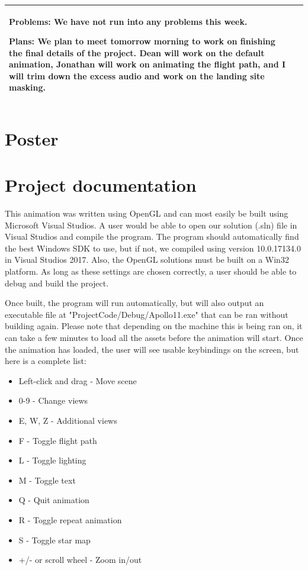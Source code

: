 \documentclass[onecolumn, draftclsnofoot,10pt, compsoc]{IEEEtran}
\begin{document}
\begin{longtable} {|p{1.5cm}|p{13.5cm}|}
Problems: We have not run into any problems this week.

Plans: We plan to meet tomorrow morning to work on finishing the final details of the project. Dean will work on the default animation, Jonathan will work on animating the flight path, and I will trim down the excess audio and work on the landing site masking.
\\ \hline

\end{longtable}

\section{Poster}


\section{Project documentation}

This animation was written using OpenGL and can most easily be built using Microsoft Visual Studios. A user would be able to open our solution (.sln) file in Visual Studios and compile the program. The program should automatically find the best Windows SDK to use, but if not, we compiled using version 10.0.17134.0 in Visual Studios 2017. Also, the OpenGL solutions must be built on a Win32 platform. As long as these settings are chosen correctly, a user should be able to debug and build the project. 

Once built, the program will run automatically, but will also output an executable file at "ProjectCode/Debug/Apollo11.exe" that can be ran without building again. Please note that depending on the machine this is being ran on, it can take a few minutes to load all the assets before the animation will start. Once the animation has loaded, the user will see usable keybindings on the screen, but here is a complete list: 
\begin{itemize}
\item Left-click and drag - Move scene
\item 0-9 - Change views 
\item E, W, Z - Additional views
\item F - Toggle flight path
\item L - Toggle lighting
\item M - Toggle text
\item Q - Quit animation
\item R - Toggle repeat animation
\item S - Toggle star map
\item +/- or scroll wheel - Zoom in/out
\end{itemize}
\end{document}
